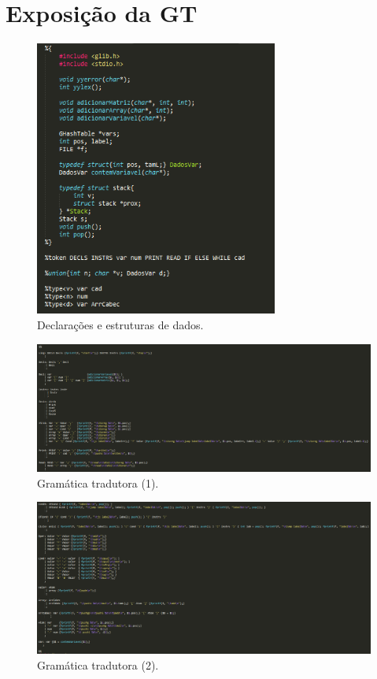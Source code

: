 \documentclass{report}
\begin{document}
\section{Exposição da GT}
\begin{figure}[ht]
\centering
\includegraphics[width=80mm, scale=0.5]{gt1.png}
\caption{\label{fig:change}Declarações e estruturas de dados.}
\end{figure}

\begin{figure}[ht]
\centering
\includegraphics[width=180mm, scale=0.9]{gt2.PNG}
\caption{\label{fig:change}Gramática tradutora (1).}
\end{figure}

\begin{figure}[ht]
\centering
\includegraphics[width=180mm, scale=0.9]{gt3.PNG}
\caption{\label{fig:change}Gramática tradutora (2).}
\end{figure}
\end{document}
